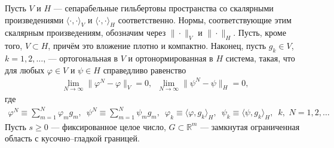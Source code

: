 \documentclass{report}
\begin{document}
Пусть $V$ и $H$ --- сепарабельные гильбертовы пространства со скалярными произведениями $\langle\cdot,\cdot\rangle_V$ и $\langle\cdot,\cdot\rangle_H$ соответственно. Нормы, соответствующие
этим скалярным произведениям, обозначим через $\|\cdot\|_V$ и $\|\cdot\|_H$. Пусть, кроме того, $V\subset H$, причём это вложение плотно и компактно. Наконец, пусть $g_k\in V$,
$k=1,2,\dots$, --- ортогональная в $V$ и ортонормированная в $H$ система, такая, что для любых $\varphi\in V$ и $\psi\in H$ справедливо равенство
\begin{gather}\label{VHphipsi_approx}
\lim\limits_{N\to\infty}\|\varphi^N-\varphi\|_V=0,\,\,\,\lim\limits_{N\to\infty}\|\psi^N-\psi\|_H=0,
\end{gather}
где
\begin{gather*}
\varphi^N\equiv\sum\limits_{m=1}^N\varphi_mg_m,\,\,\,\psi^N\equiv\sum\limits_{m=1}^N\psi_mg_m,
\,\,\,\varphi_k\equiv\langle\varphi,g_k\rangle_H,\,\,\, \psi_k\equiv\langle\psi,g_k\rangle_H,\,\,\,k,\,\,N=1,2,\dots
\end{gather*}
Пусть $s\geqslant0$ --- фиксированное целое число, $G\subset \mathbb{R}^{m}$ --- замкнутая ограниченная область с кусочно--гладкой границей.
\end{document}
